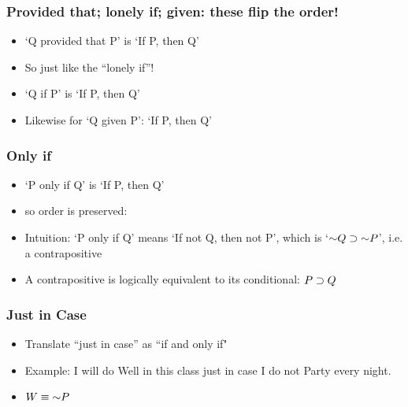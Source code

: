 \begin{frame}
\frametitle{Provided that; lonely if; given: these flip the order!}

\begin{itemize}[<+->]

\item `Q provided that P' is `If P, then Q'

\item So just like the ``lonely if''!

\item `Q if P' is `If P, then Q'

\item Likewise for `Q given P': `If P, then Q' 

\end{itemize}
\end{frame}

\begin{frame}
\frametitle{Only if}

\begin{itemize}[<+->]

\item `P only if Q' is `If P, then Q'

\item so order is preserved:

\item Intuition: `P only if Q' means `If not Q, then not P', which is `$\enot Q \eif \enot P$', i.e. a contrapositive

\item A contrapositive is logically equivalent to its conditional: $P \supset Q$

\end{itemize}
\end{frame}

\begin{frame}
\frametitle{Just in Case}

\begin{itemize}[<+->]

\item Translate ``just in case'' as ``if and only if"

\item Example: I will do Well in this class just in case I do not Party every night.

\item $W \eiff \enot P$

\end{itemize}
\end{frame}


